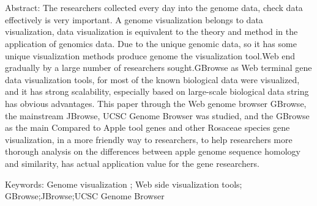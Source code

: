 \chapter*{\LARGE \heiti \enthtopic}

\vspace{1em}

 {\normalsize \heiti Abstract: }{\small The researchers collected every day into the genome data, check data effectively is very important. A genome visualization belongs to data visualization, data visualization is equivalent to the theory and method in the application of genomics data. Due to the unique genomic data, so it has some unique visualization methods produce genome the visualization tool.Web end gradually by a large number of researchers sought.GBrowse as Web terminal gene data visualization tools, for most of the known biological data were visualized, and it has strong scalability, especially based on large-scale biological data string has obvious advantages. This paper through the Web genome browser GBrowse, the mainstream JBrowse, UCSC Genome Browser was studied, and the GBrowse as the main Compared to Apple tool genes and other Rosaceae species gene visualization, in a more friendly way to researchers, to help researchers more thorough analysis on the differences between apple genome sequence homology and similarity, has actual application value for the gene researchers.}

{\normalsize \heiti Keywords: }{\small Genome visualization ; Web side visualization tools; GBrowse;JBrowse;UCSC Genome Browser}
\thispagestyle{empty}

